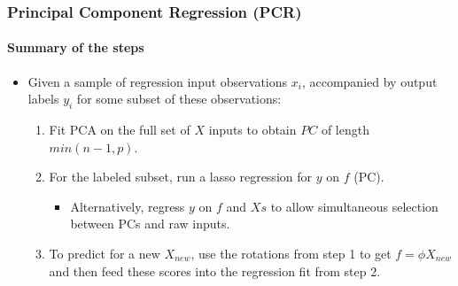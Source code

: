 \documentclass[
  shownotes,
  xcolor={svgnames},
  hyperref={colorlinks,citecolor=DarkBlue,linkcolor=DarkRed,urlcolor=DarkBlue}
  , aspectratio=169]{beamer}
\begin{document}
\begin{frame}[fragile]
\frametitle{ Principal Component Regression (PCR)}
\framesubtitle{Summary of the steps}

\begin{itemize}

\item Given a sample of regression input observations $x_i$, accompanied by output labels $y_i$ for some subset of these observations: 
\medskip
\begin{enumerate}

  \item Fit PCA on the full set of $X$ inputs to obtain $PC$ of length $min(n-1, p)$. 
  \medskip
  \item For the labeled subset, run a lasso regression for $y$ on $f$ (PC).
  \medskip
    \begin{itemize}
      \item Alternatively, regress $y$ on $f$  and $Xs$ to allow simultaneous selection between PCs and raw inputs. 
      \medskip
    \end{itemize}
  \item To predict for a new $X_{new}$, use the rotations from step 1 to get $f = \phi X_{new}$ and then feed these scores into the regression fit from step 2. 
  \end{enumerate}

\end{itemize}



\end{frame}
\end{document}
